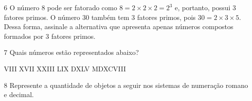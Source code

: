 \num{6}  O número $8$ pode ser fatorado como $8 = 2\times 2\times 2 = 2^3$ e, portanto,
possui $3$ fatores primos. O número $30$ também tem $3$ fatores primos, pois
$30 = 2\times 3\times 5$. Dessa forma, assinale a alternativa que apresenta apenas
números compostos formados por $3$ fatores primos.




\num{7}  Quais números estão representados abaixo?

\begin{mdframed}[linewidth=2pt,linecolor=azul!20,backgroundcolor=azul!20,roundcorner=2pt]
VIII \hfill XVII \hfill XXIII \hfill LIX \hfill DXLV \hfill MDXCVIII
\end{mdframed}



\num{8}  Represente a quantidade de objetos a seguir nos sistemas de numeração
romano e decimal.

\begin{escolha}
\item {}
\item {}
\item {}
\end{escolha}





